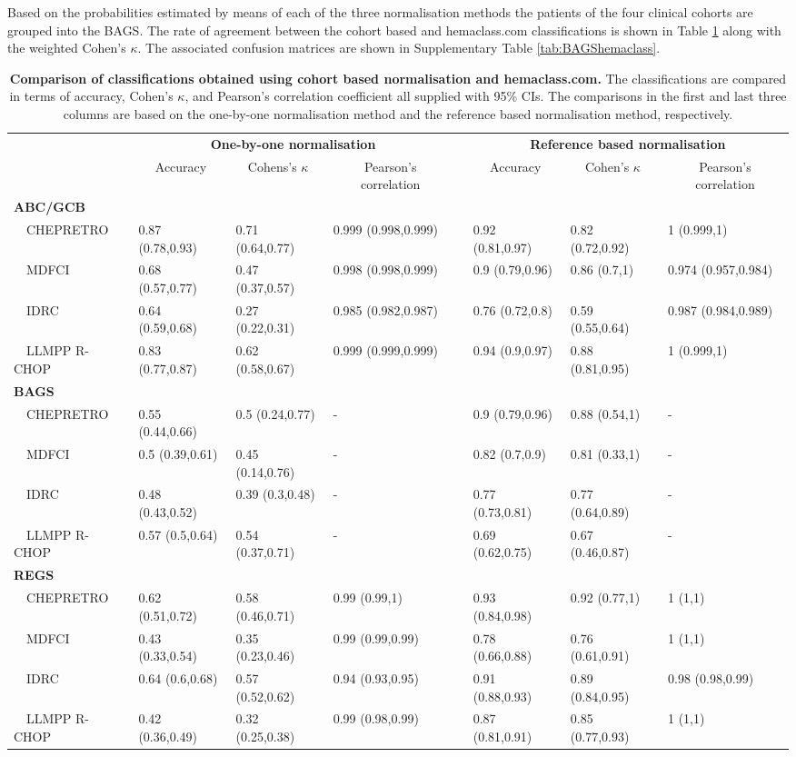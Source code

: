 \documentclass[10pt]{bmc_article}
\newenvironment{bmcformat}{\fussy\setboolean{publ}{true}}{\fussy}
\begin{document}
\begin{bmcformat}
Based on the probabilities estimated by means of each of the three normalisation methods the patients of the four clinical cohorts are grouped into the BAGS. The rate of agreement between the cohort based and hemaclass.com classifications is shown in Table \ref{tab:classALL} along with the weighted Cohen's $\kappa$.  The associated confusion matrices are shown in Supplementary Table \ref{tab:BAGShemaclass}.



\begin{table}[!tbp]
\footnotesize
\tabcolsep=0.11cm
\caption{\textbf{Comparison of classifications obtained using cohort based normalisation and hemaclass.com.} The classifications are compared in terms of accuracy, Cohen's $\kappa$, and Pearson's correlation coefficient all supplied with 95\% CIs. The comparisons in the first and last three columns are based on the one-by-one normalisation method and the reference based normalisation method, respectively.\label{tab:classALL}}
\begin{center}
\begin{tabular}{llllclll}
\toprule
\multicolumn{1}{l}{\bfseries }&\multicolumn{3}{c}{\bfseries One-by-one normalisation}&\multicolumn{1}{c}{\bfseries }&\multicolumn{3}{c}{\bfseries Reference based normalisation}\tabularnewline
\cline{2-4} \cline{6-8}
\multicolumn{1}{l}{}&\multicolumn{1}{c}{Accuracy}&\multicolumn{1}{c}{Cohens's $\kappa$}&\multicolumn{1}{c}{Pearson's correlation}&\multicolumn{1}{c}{}&\multicolumn{1}{c}{Accuracy}&\multicolumn{1}{c}{Cohen's $\kappa$}&\multicolumn{1}{c}{Pearson's correlation}\tabularnewline
\hline
{\bfseries ABC/GCB}&&&&&&&\tabularnewline
~~CHEPRETRO&0.87 (0.78,0.93)&0.71 (0.64,0.77)&0.999 (0.998,0.999)&&0.92 (0.81,0.97)&0.82 (0.72,0.92)&1 (0.999,1)\tabularnewline
~~MDFCI&0.68 (0.57,0.77)&0.47 (0.37,0.57)&0.998 (0.998,0.999)&&0.9 (0.79,0.96)&0.86 (0.7,1)&0.974 (0.957,0.984)\tabularnewline
~~IDRC&0.64 (0.59,0.68)&0.27 (0.22,0.31)&0.985 (0.982,0.987)&&0.76 (0.72,0.8)&0.59 (0.55,0.64)&0.987 (0.984,0.989)\tabularnewline
~~LLMPP R-CHOP&0.83 (0.77,0.87)&0.62 (0.58,0.67)&0.999 (0.999,0.999)&&0.94 (0.9,0.97)&0.88 (0.81,0.95)&1 (0.999,1)\tabularnewline
\hline
{\bfseries BAGS}&&&&&&&\tabularnewline
~~CHEPRETRO&0.55 (0.44,0.66)&0.5 (0.24,0.77)&-&&0.9 (0.79,0.96)&0.88 (0.54,1)&-\tabularnewline
~~MDFCI&0.5 (0.39,0.61)&0.45 (0.14,0.76)&-&&0.82 (0.7,0.9)&0.81 (0.33,1)&-\tabularnewline
~~IDRC&0.48 (0.43,0.52)&0.39 (0.3,0.48)&-&&0.77 (0.73,0.81)&0.77 (0.64,0.89)&-\tabularnewline
~~LLMPP R-CHOP&0.57 (0.5,0.64)&0.54 (0.37,0.71)&-&&0.69 (0.62,0.75)&0.67 (0.46,0.87)&-\tabularnewline
\hline
{\bfseries REGS}&&&&&&&\tabularnewline
~~CHEPRETRO&0.62 (0.51,0.72)&0.58 (0.46,0.71)&0.99 (0.99,1)&&0.93 (0.84,0.98)&0.92 (0.77,1)&1 (1,1)\tabularnewline
~~MDFCI&0.43 (0.33,0.54)&0.35 (0.23,0.46)&0.99 (0.99,0.99)&&0.78 (0.66,0.88)&0.76 (0.61,0.91)&1 (1,1)\tabularnewline
~~IDRC&0.64 (0.6,0.68)&0.57 (0.52,0.62)&0.94 (0.93,0.95)&&0.91 (0.88,0.93)&0.89 (0.84,0.95)&0.98 (0.98,0.99)\tabularnewline
~~LLMPP R-CHOP&0.42 (0.36,0.49)&0.32 (0.25,0.38)&0.99 (0.98,0.99)&&0.87 (0.81,0.91)&0.85 (0.77,0.93)&1 (1,1)\tabularnewline
\hline
\end{tabular}
\end{center}
\end{table}



\end{bmcformat}
\end{document}
